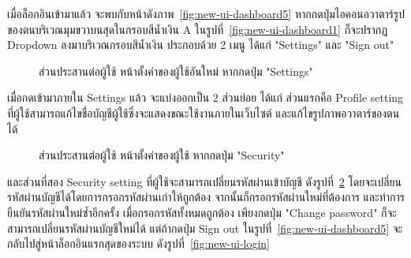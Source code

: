 \documentclass[12pt,one side,openright,a4paper]{cpe-thesis-th}
\newcommand{\thaijustify}[1]{%
  \par\hspace{30pt}\justifying
  #1
}
\begin{document}
                \thaijustify{
                    เมื่อล็อกอินเข้ามาแล้ว จะพบกับหน้าดังภาพ~\ref{fig:new-ui-dashboard5} หากกดปุ่มไอคอนอวาตาร์รูปของตนบริเวณมุมขวาบนสุดในกรอบสีน้ำเงิน A ในรูปที่~\ref{fig:new-ui-dashboard1} ก็จะปรากฏ Dropdown ลงมาบริเวณกรอบสีน้ำเงิน ประกอบด้วย 2 เมนู ได้แก่ "Settings" และ "Sign out"
                }
                \begin{figure}[H]
                    \centering
                    \caption[ส่วนประสานต่อผู้ใช้ หน้าตั้งค่าของผู้ใช้อันใหม่ (กดปุ่ม "Settings")]{ส่วนประสานต่อผู้ใช้ หน้าตั้งค่าของผู้ใช้อันใหม่ หากกดปุ่ม "Settings"}
                    \label{fig:new-ui-setting1}
                \end{figure}
                \thaijustify{
                    เมื่อกดเข้ามาภายใน Settings แล้ว จะแบ่งออกเป็น 2 ส่วนย่อย ได้แก่ ส่วนแรกคือ Profile setting ที่ผู้ใช้สามารถแก้ไขชื่อบัญชีผู้ใช้ซึ่งจะแสดงขณะใช้งานภายในเว็บไซต์ และแก้ไขรูปภาพอวาตาร์ของตนได้
                }
                \begin{figure}[H]
                    \centering
                    \caption[ส่วนประสานต่อผู้ใช้ หน้าตั้งค่าของผู้ใช้ (กดปุ่ม "Security")]{ส่วนประสานต่อผู้ใช้ หน้าตั้งค่าของผู้ใช้ หากกดปุ่ม "Security"}
                    \label{fig:new-ui-setting2}
                \end{figure}
                \thaijustify{
                    และส่วนที่สอง Security setting ที่ผู้ใช้จะสามารถเปลี่ยนรหัสผ่านเข้าบัญชี ดังรูปที่~\ref{fig:new-ui-setting2} โดยจะเปลี่ยนรหัสผ่านบัญชีได้โดยการกรอกรหัสผ่านเก่าให้ถูกต้อง จากนั้นก็กรอกรหัสผ่านใหม่ที่ต้องการ และทำการยืนยันรหัสผ่านใหม่ซ้ำอีกครั้ง เมื่อกรอกรหัสทั้งหมดถูกต้อง เพียงกดปุ่ม "Change password" ก็จะสามารถเปลี่ยนรหัสผ่านบัญชีใหม่ได้ แต่ถ้ากดปุ่ม Sign out ในรูปที่~\ref{fig:new-ui-dashboard5} จะกลับไปสู่หน้าล็อกอินแรกสุดของระบบ ดังรูปที่~\ref{fig:new-ui-login}
                }
    
\end{document}
